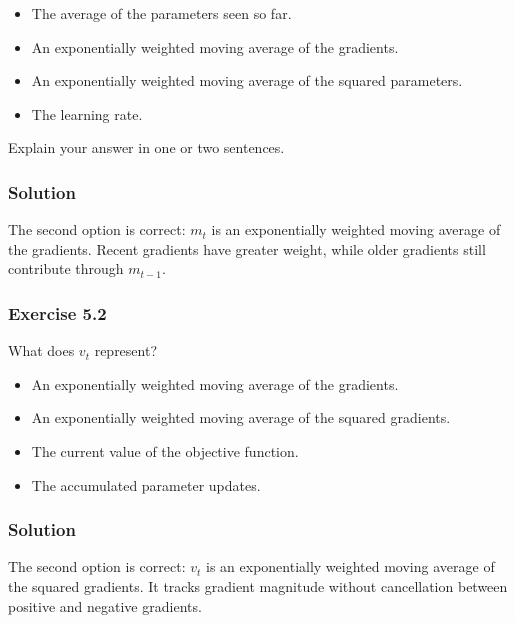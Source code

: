 \documentclass[10pt]{article}
\begin{document}
\begin{itemize}
\item
[ ] The average of the parameters seen so far.

\item
[ ] An exponentially weighted moving average of the gradients.

\item
[ ] An exponentially weighted moving average of the squared parameters.

\item
[ ] The learning rate.

\end{itemize}
Explain your answer in one or two sentences.

\begingroup\color{red}

\subsubsection*{Solution}
The second option is correct: $m_t$ is an exponentially weighted moving average of the gradients. Recent gradients have greater weight, while older gradients still contribute through $m_{t-1}$.

\par\endgroup

\subsubsection*{Exercise 5.2}
What does $v_t$ represent?

\begin{itemize}
\item
[ ] An exponentially weighted moving average of the gradients.

\item
[ ] An exponentially weighted moving average of the squared gradients.

\item
[ ] The current value of the objective function.

\item
[ ] The accumulated parameter updates.

\end{itemize}
\begingroup\color{red}

\subsubsection*{Solution}
The second option is correct: $v_t$ is an exponentially weighted moving average of the squared gradients. It tracks gradient magnitude without cancellation between positive and negative gradients.
\end{document}
